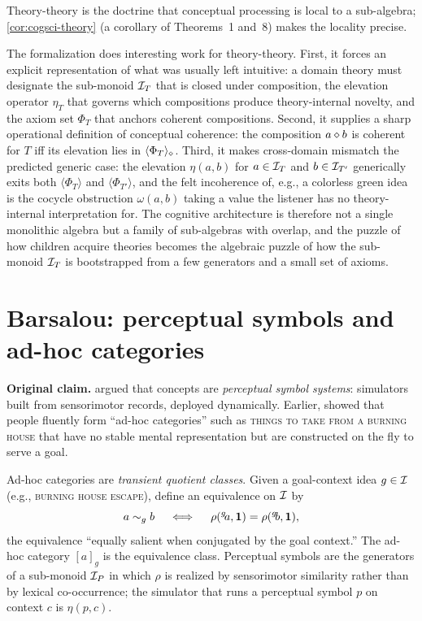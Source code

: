 \formalstatus Theory-theory is the doctrine that conceptual processing is
local to a sub-algebra; \cref{cor:cogsci-theory} (a corollary of Theorems~1
and~8) makes the locality precise.

\litcomment The formalization does interesting work for theory-theory.
First, it forces an explicit representation of what was usually left
intuitive: a domain theory must designate the sub-monoid $\mathcal{I}_T$ that
is closed under composition, the elevation operator $\eta_T$ that
governs which compositions produce theory-internal novelty, and the axiom
set $\Phi_T$ that anchors coherent compositions. Second, it supplies a
sharp operational definition of conceptual coherence: the composition
$a\mathbin{\diamond} b$ is coherent for $T$ iff its elevation lies in
$\langle\Phi_T\rangle_{\mathbin{\diamond}}$. Third, it makes cross-domain mismatch
the predicted generic case: the elevation $\eta(a,b)$ for $a\in\mathcal{I}_T$
and $b\in\mathcal{I}_{T'}$ generically exits both $\langle\Phi_T\rangle$ and
$\langle\Phi_{T'}\rangle$, and the felt incoherence of, e.g., a colorless
green idea is the cocycle obstruction $\omega(a,b)$ taking a value the
listener has no theory-internal interpretation for. The cognitive
architecture is therefore not a single monolithic algebra but a family of
sub-algebras with overlap, and the puzzle of how children acquire
theories \citep{MurphyMedin1985} becomes the algebraic puzzle of how the
sub-monoid $\mathcal{I}_T$ is bootstrapped from a few generators and a small
set of axioms.

\section{Barsalou: perceptual symbols and ad-hoc categories}\label{sec:cogsci-barsalou}

\textbf{Original claim.} \citet{Barsalou1999} argued that concepts are
\emph{perceptual symbol systems}: simulators built from sensorimotor
records, deployed dynamically. Earlier, \citet{Barsalou1983} showed that
people fluently form ``ad-hoc categories'' such as \textsc{things to take
from a burning house} that have no stable mental representation but are
constructed on the fly to serve a goal.

\formalclaim Ad-hoc categories are \emph{transient quotient classes}.
Given a goal-context idea $g\in\mathcal{I}$ (e.g., \textsc{burning house
escape}), define an equivalence on $\mathcal{I}$ by
\[
  a\sim_g b \quad\iff\quad
  \rho({}^{g}\!a,\mathbf{1})=\rho({}^{g}\!b,\mathbf{1}),
\]
the equivalence ``equally salient when conjugated by the goal context.''
The ad-hoc category $[a]_g$ is the equivalence class. Perceptual symbols
are the generators of a sub-monoid $\mathcal{I}_P$ in which $\rho$ is realized
by sensorimotor similarity rather than by lexical co-occurrence; the
simulator that runs a perceptual symbol $p$ on context $c$ is
$\eta(p,c)$.

